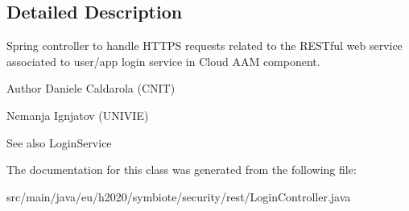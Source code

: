 \subsection{Detailed Description}
Spring controller to handle H\+T\+T\+PS requests related to the R\+E\+S\+Tful web service associated to user/app login service in Cloud A\+AM component.

\begin{DoxyAuthor}{Author}
Daniele Caldarola (C\+N\+IT) 

Nemanja Ignjatov (U\+N\+I\+V\+IE) 
\end{DoxyAuthor}
\begin{DoxySeeAlso}{See also}
Login\+Service 
\end{DoxySeeAlso}


The documentation for this class was generated from the following file\+:\begin{DoxyCompactItemize}
\item 
src/main/java/eu/h2020/symbiote/security/rest/Login\+Controller.\+java\end{DoxyCompactItemize}
